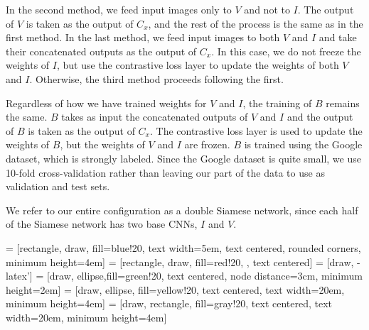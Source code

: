 In the second method, we feed input images only to $V$ and not to $I$. The output of $V$ is taken as the output of $C_x$, and the rest of the process is the same as in the first method. In the last method, we feed input images to both $V$ and $I$ and take their concatenated outputs as the output of $C_x$. In this case, we do not freeze the weights of $I$, but use the contrastive loss layer to update the weights of both $V$ and $I$. Otherwise, the third method proceeds following the first.

Regardless of how we have trained weights for $V$ and $I$, the training of $B$ remains the same. $B$ takes as input the concatenated outputs of $V$ and $I$ and the output of $B$ is taken as the output of $C_x$. The contrastive loss layer is used to update the weights of $B$, but the weights of $V$ and $I$ are frozen. $B$ is trained using the Google dataset, which is strongly labeled. Since the Google dataset is quite small, we use 10-fold cross-validation rather than leaving our part of the data to use as validation and test sets.

We refer to our entire configuration as a double Siamese network, since each half of the Siamese network has two base CNNs, $I$ and $V$.

 = [rectangle, draw, fill=blue!20, 
text width=5em, text centered, rounded corners, minimum height=4em]
 = [rectangle, draw, fill=red!20, , text centered]
 = [draw, -latex']
 = [draw, ellipse,fill=green!20, text centered, node distance=3cm,
minimum height=2em]
 = [draw, ellipse, fill=yellow!20, text centered,  text width=20em, minimum height=4em]
 = [draw, rectangle, fill=gray!20, text centered,  text width=20em, minimum height=4em]

